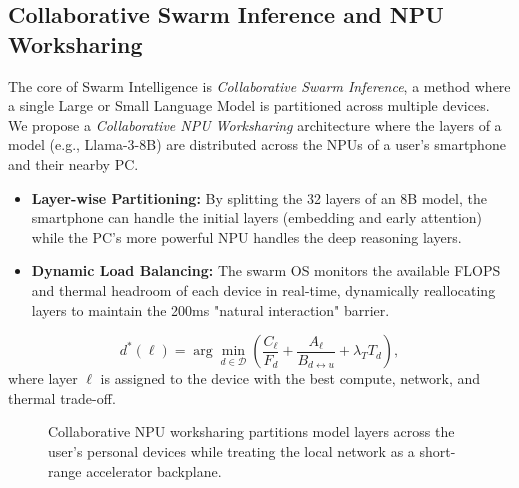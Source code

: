 \documentclass[twocolumn,10pt]{article}
\begin{document}
\subsection{Collaborative Swarm Inference and NPU Worksharing}
The core of Swarm Intelligence is \textit{Collaborative Swarm Inference}, a method where a single Large or Small Language Model is partitioned across multiple devices. We propose a \textit{Collaborative NPU Worksharing} architecture where the layers of a model (e.g., Llama-3-8B) are distributed across the NPUs of a user's smartphone and their nearby PC. 
\begin{itemize}
    \item \textbf{Layer-wise Partitioning:} By splitting the 32 layers of an 8B model, the smartphone can handle the initial layers (embedding and early attention) while the PC's more powerful NPU handles the deep reasoning layers.
    \item \textbf{Dynamic Load Balancing:} The swarm OS monitors the available FLOPS and thermal headroom of each device in real-time, dynamically reallocating layers to maintain the 200ms "natural interaction" barrier.
\end{itemize}
\begin{equation}
d^*(\ell)=\arg\min_{d\in\mathcal{D}}
\left(\frac{C_\ell}{F_d}+\frac{A_\ell}{B_{d\leftrightarrow u}}+\lambda_T T_d\right),
\label{eq:swarm_partition}
\end{equation}
where layer $\ell$ is assigned to the device with the best compute, network, and thermal trade-off.

\begin{figure}[t]
\centering
{}
\caption{Collaborative NPU worksharing partitions model layers across the user's personal devices while treating the local network as a short-range accelerator backplane.}
\label{fig:swarm}
\end{figure}
\end{document}
